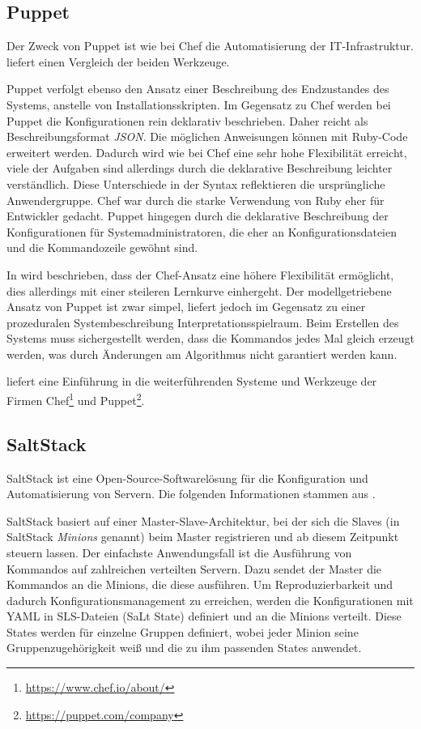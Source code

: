 \subsection{Puppet}
\label{sub:puppet}
Der Zweck von Puppet ist wie bei Chef die Automatisierung der IT-Infrastruktur. \autocite{Wolff201604} liefert einen Vergleich der beiden Werkzeuge.

Puppet verfolgt ebenso den Ansatz einer Beschreibung des Endzustandes des Systems, anstelle von Installationsskripten.
Im Gegensatz zu Chef werden bei Puppet die Konfigurationen rein deklarativ beschrieben.
Daher reicht als Beschreibungsformat \emph{JSON}.
Die möglichen Anweisungen können mit Ruby-Code erweitert werden.
Dadurch wird wie bei Chef eine sehr hohe Flexibilität erreicht, viele der Aufgaben sind allerdings durch die deklarative Beschreibung leichter verständlich.
Diese Unterschiede in der Syntax reflektieren die ursprüngliche Anwendergruppe.
Chef war durch die starke Verwendung von Ruby eher für Entwickler gedacht.
Puppet hingegen durch die deklarative Beschreibung der Konfigurationen für Systemadministratoren, die eher an Konfigurationsdateien und die Kommandozeile gewöhnt sind.

In \autocite{chef-vs-puppet:online} wird beschrieben, dass der Chef-Ansatz eine höhere Flexibilität ermöglicht, dies allerdings mit einer steileren Lernkurve einhergeht.
Der modellgetriebene Ansatz von Puppet ist zwar simpel, liefert jedoch im Gegensatz zu einer prozeduralen Systembeschreibung Interpretationsspielraum.
Beim Erstellen des Systems muss sichergestellt werden, dass die Kommandos jedes Mal gleich erzeugt werden, was durch Änderungen am Algorithmus nicht garantiert werden kann.

\autocite{chef-vs-puppet-revisited:online} liefert eine Einführung in die weiterführenden Systeme und Werkzeuge der Firmen Chef\footnote{\url{https://www.chef.io/about/}} und Puppet\footnote{\url{https://puppet.com/company}}.

\subsection{SaltStack}
\label{sub:saltstack}
SaltStack ist eine Open-Source-Softwarelösung für die Konfiguration und Automatisierung von Servern.
Die folgenden Informationen stammen aus \autocite{SaltStack:online}.

SaltStack basiert auf einer Master-Slave-Architektur, bei der sich die Slaves (in SaltStack \emph{Minions} genannt) beim Master registrieren und ab diesem Zeitpunkt steuern lassen.
Der einfachste Anwendungsfall ist die Ausführung von Kommandos auf zahlreichen verteilten Servern.
Dazu sendet der Master die Kommandos an die Minions, die diese ausführen.
Um Reproduzierbarkeit und dadurch Konfigurationsmanagement zu erreichen, werden die Konfigurationen mit YAML in SLS-Dateien (SaLt State) definiert und an die Minions verteilt.
Diese States werden für einzelne Gruppen definiert, wobei jeder Minion seine Gruppenzugehörigkeit weiß und die zu ihm passenden States anwendet.

